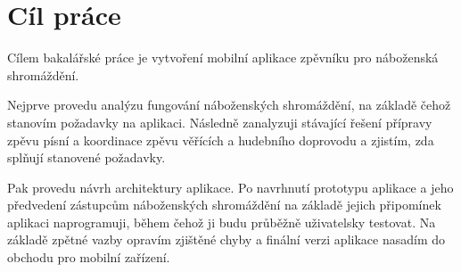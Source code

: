 \chapter{Cíl práce}

Cílem bakalářské práce je vytvoření mobilní aplikace zpěvníku pro náboženská shromáždění.

Nejprve provedu analýzu fungování náboženských shromáždění, na základě čehož stanovím požadavky na aplikaci. Následně zanalyzuji stávající řešení přípravy zpěvu písní a koordinace zpěvu věřících a hudebního doprovodu a zjistím, zda splňují stanovené požadavky.

Pak provedu návrh architektury aplikace. Po navrhnutí prototypu aplikace a jeho předvedení zástupcům náboženských shromáždění na základě jejich připomínek aplikaci naprogramuji, během čehož ji budu průběžně uživatelsky testovat. Na základě zpětné vazby opravím zjištěné chyby a finální verzi aplikace nasadím do obchodu pro mobilní zařízení.
